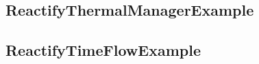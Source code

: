 \documentclass[../main.tex]{subfiles}
\begin{document}
\subsection{ReactifyThermalManagerExample}

\subsection{ReactifyTimeFlowExample}
\end{document}
